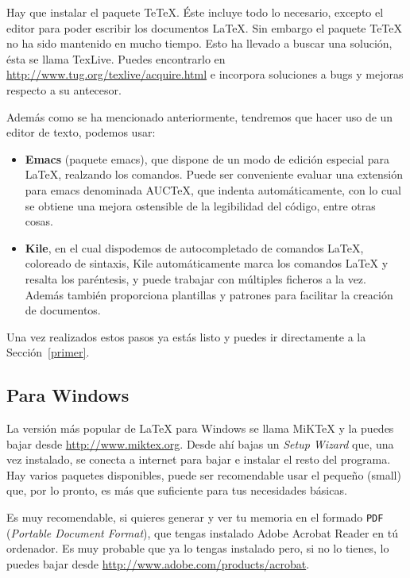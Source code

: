 Hay que instalar el paquete Te\TeX{}. \'Este incluye todo lo necesario, excepto el editor para poder escribir 
los documentos \LaTeX{}. Sin embargo el paquete Te\TeX{} no ha sido mantenido en mucho tiempo. Esto ha llevado a buscar 
una soluci\'on, \'esta se llama TexLive. Puedes encontrarlo en \url{http://www.tug.org/texlive/acquire.html} e incorpora soluciones a bugs y mejoras respecto a su antecesor.

Adem\'as como se ha mencionado anteriormente, tendremos que hacer uso de un editor de texto, podemos usar:
			
						\begin{itemize}
								\item \textbf{Emacs} (paquete emacs), que dispone de un modo de edici\'on especial para \LaTeX{}, realzando 
										los comandos. Puede ser conveniente evaluar una extensi\'on para emacs denominada AUCTeX, que indenta 
										autom\'aticamente, con lo cual se obtiene una mejora ostensible de la legibilidad del c\'odigo, entre 
										otras cosas.
						
								\item \textbf{Kile}, en el cual dispodemos de autocompletado de comandos \LaTeX{}, coloreado de sintaxis, 
										Kile autom\'aticamente marca los comandos \LaTeX{} y resalta los par\'entesis, y puede trabajar 
										con m\'ultiples ficheros a la vez. Adem\'as tambi\'en proporciona plantillas y patrones para facilitar 
										la creaci\'on de documentos.
						\end{itemize}

Una vez realizados estos pasos ya est\'as listo y puedes ir directamente a la Secci\'on~\ref{primer}.


\subsection{Para Windows}

La versi\'on m\'as popular de \LaTeX{} para Windows se llama MiK\TeX{} y la puedes bajar desde \url{http://www.miktex.org}.
Desde ah\'i bajas un \emph{Setup Wizard} que, una vez instalado, se conecta a
internet para bajar e instalar el resto del programa. Hay varios paquetes
disponibles, puede ser recomendable usar el peque\~no (small) que, por lo pronto, es m\'as
que suficiente para tus necesidades b\'asicas.

Es muy recomendable, si quieres generar y ver tu memoria en el formado \texttt{PDF}
(\emph{Portable Document Format}), que tengas instalado Adobe Acrobat Reader en t\'u
ordenador. Es muy probable que ya lo tengas instalado pero, si no lo tienes, lo puedes
bajar desde \url{http://www.adobe.com/products/acrobat}.

